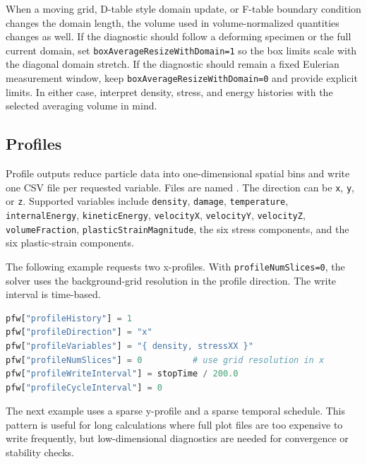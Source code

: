 When a moving grid, D-table style domain update, or F-table boundary condition changes the domain length, the volume used in volume-normalized quantities changes as well.  If the diagnostic should follow a deforming specimen or the full current domain, set \texttt{boxAverageResizeWithDomain=1} so the box limits scale with the diagonal domain stretch.  If the diagnostic should remain a fixed Eulerian measurement window, keep \texttt{boxAverageResizeWithDomain=0} and provide explicit limits.  In either case, interpret density, stress, and energy histories with the selected averaging volume in mind.

\subsection{Profiles}
\label{subsec:pfw-profiles}

Profile outputs reduce particle data into one-dimensional spatial bins and write one CSV file per requested variable.  Files are named .  The direction can be \texttt{x}, \texttt{y}, or \texttt{z}.  Supported variables include \texttt{density}, \texttt{damage}, \texttt{temperature}, \texttt{internalEnergy}, \texttt{kineticEnergy}, \texttt{velocityX}, \texttt{velocityY}, \texttt{velocityZ}, \texttt{volumeFraction}, \texttt{plasticStrainMagnitude}, the six stress components, and the six plastic-strain components.

The following example requests two x-profiles.  With \texttt{profileNumSlices=0}, the solver uses the background-grid resolution in the profile direction.  The write interval is time-based.

\begin{lstlisting}[language=Python,caption={X-profiles of density and axial stress using grid-cell spacing.}]
pfw["profileHistory"] = 1
pfw["profileDirection"] = "x"
pfw["profileVariables"] = "{ density, stressXX }"
pfw["profileNumSlices"] = 0          # use grid resolution in x
pfw["profileWriteInterval"] = stopTime / 200.0
pfw["profileCycleInterval"] = 0
\end{lstlisting}

The next example uses a sparse y-profile and a sparse temporal schedule.  This pattern is useful for long calculations where full plot files are too expensive to write frequently, but low-dimensional diagnostics are needed for convergence or stability checks.

